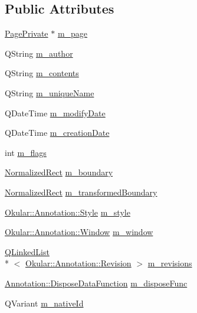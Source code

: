 \subsection*{Public Attributes}
\begin{DoxyCompactItemize}
\item 
\hyperlink{classOkular_1_1PagePrivate}{Page\+Private} $\ast$ \hyperlink{classOkular_1_1AnnotationPrivate_a2db3806670326880d0d7e6e1986d35f4}{m\+\_\+page}
\item 
Q\+String \hyperlink{classOkular_1_1AnnotationPrivate_af2997724c734cbd4dfbc6536e280d536}{m\+\_\+author}
\item 
Q\+String \hyperlink{classOkular_1_1AnnotationPrivate_ab2b69e4809035828d98a4ec701565149}{m\+\_\+contents}
\item 
Q\+String \hyperlink{classOkular_1_1AnnotationPrivate_a31b33f971130850a5b5bf67ce58ae5f1}{m\+\_\+unique\+Name}
\item 
Q\+Date\+Time \hyperlink{classOkular_1_1AnnotationPrivate_a8663feeb255860d7c7b57b389c307b0d}{m\+\_\+modify\+Date}
\item 
Q\+Date\+Time \hyperlink{classOkular_1_1AnnotationPrivate_ad4afb1827157f15bf3b5984e5f62c7a3}{m\+\_\+creation\+Date}
\item 
int \hyperlink{classOkular_1_1AnnotationPrivate_ae7ada31b42bb74e306f26a9126110226}{m\+\_\+flags}
\item 
\hyperlink{classOkular_1_1NormalizedRect}{Normalized\+Rect} \hyperlink{classOkular_1_1AnnotationPrivate_a58948ebd679895ca16c5f9f917f23323}{m\+\_\+boundary}
\item 
\hyperlink{classOkular_1_1NormalizedRect}{Normalized\+Rect} \hyperlink{classOkular_1_1AnnotationPrivate_afb3198f13aa201601c71493bd2a32f63}{m\+\_\+transformed\+Boundary}
\item 
\hyperlink{classOkular_1_1Annotation_1_1Style}{Okular\+::\+Annotation\+::\+Style} \hyperlink{classOkular_1_1AnnotationPrivate_af49e79222d9e16611c0abd90533bc206}{m\+\_\+style}
\item 
\hyperlink{classOkular_1_1Annotation_1_1Window}{Okular\+::\+Annotation\+::\+Window} \hyperlink{classOkular_1_1AnnotationPrivate_abcd3da119de1991beff85973cd951b64}{m\+\_\+window}
\item 
\hyperlink{classQLinkedList}{Q\+Linked\+List}\\*
$<$ \hyperlink{classOkular_1_1Annotation_1_1Revision}{Okular\+::\+Annotation\+::\+Revision} $>$ \hyperlink{classOkular_1_1AnnotationPrivate_ab1c9337e62d1d85d6f3b9d0dc120fc8d}{m\+\_\+revisions}
\item 
\hyperlink{classOkular_1_1Annotation_a4f2759100645cdce807944767937dd18}{Annotation\+::\+Dispose\+Data\+Function} \hyperlink{classOkular_1_1AnnotationPrivate_a70d2e116a0c842eacddb589269e554eb}{m\+\_\+dispose\+Func}
\item 
Q\+Variant \hyperlink{classOkular_1_1AnnotationPrivate_a00a26a3364d1f9f13889e6d5c8fe4cb0}{m\+\_\+native\+Id}
\end{DoxyCompactItemize}


